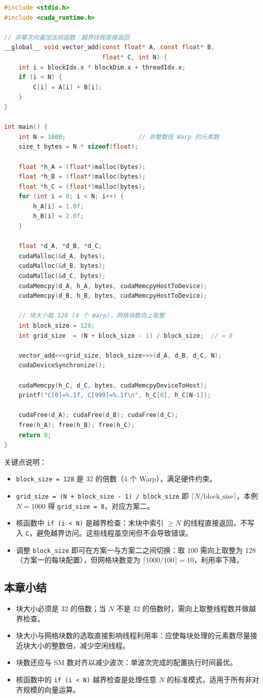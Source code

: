 \begin{lstlisting}[language=C]
#include <stdio.h>
#include <cuda_runtime.h>

// 非幂次向量加法核函数：越界线程直接返回
__global__ void vector_add(const float* A, const float* B,
                           float* C, int N) {
    int i = blockIdx.x * blockDim.x + threadIdx.x;
    if (i < N) {
        C[i] = A[i] + B[i];
    }
}

int main() {
    int N = 1000;                    // 非整数倍 Warp 的元素数
    size_t bytes = N * sizeof(float);

    float *h_A = (float*)malloc(bytes);
    float *h_B = (float*)malloc(bytes);
    float *h_C = (float*)malloc(bytes);
    for (int i = 0; i < N; i++) {
        h_A[i] = 1.0f;
        h_B[i] = 2.0f;
    }

    float *d_A, *d_B, *d_C;
    cudaMalloc(&d_A, bytes);
    cudaMalloc(&d_B, bytes);
    cudaMalloc(&d_C, bytes);
    cudaMemcpy(d_A, h_A, bytes, cudaMemcpyHostToDevice);
    cudaMemcpy(d_B, h_B, bytes, cudaMemcpyHostToDevice);

    // 块大小取 128 (4 个 Warp)，网格块数向上取整
    int block_size = 128;
    int grid_size  = (N + block_size - 1) / block_size;  // = 8

    vector_add<<<grid_size, block_size>>>(d_A, d_B, d_C, N);
    cudaDeviceSynchronize();

    cudaMemcpy(h_C, d_C, bytes, cudaMemcpyDeviceToHost);
    printf("C[0]=%.1f, C[999]=%.1f\n", h_C[0], h_C[N-1]);

    cudaFree(d_A); cudaFree(d_B); cudaFree(d_C);
    free(h_A); free(h_B); free(h_C);
    return 0;
}
\end{lstlisting}

关键点说明：

\begin{itemize}
    \item \texttt{block\_size = 128} 是 32 的倍数（4 个 Warp），满足硬件约束。
    \item \texttt{grid\_size = (N + block\_size - 1) / block\_size} 即 $\lceil N / \text{block\_size} \rceil$，本例 $N = 1000$ 得 \texttt{grid\_size = 8}，对应方案二。
    \item 核函数中 \texttt{if (i < N)} 是越界检查：末块中索引 $\geq N$ 的线程直接返回，不写入 \texttt{C}，避免越界访问。这些线程虽空闲但不会导致错误。
    \item 调整 \texttt{block\_size} 即可在方案一与方案二之间切换：取 100 需向上取整为 128（方案一的每块配置），但网格块数变为 $\lceil 1000/100\rceil = 10$，利用率下降。
\end{itemize}

\subsection{本章小结}

\begin{itemize}
    \item 块大小必须是 32 的倍数；当 $N$ 不是 32 的倍数时，需向上取整线程数并做越界检查。
    \item 块大小与网格块数的选取直接影响线程利用率：应使每块处理的元素数尽量接近块大小的整数倍，减少空闲线程。
    \item 块数还应与 SM 数对齐以减少波次：单波次完成的配置执行时间最优。
    \item 核函数中的 \texttt{if (i < N)} 越界检查是处理任意 $N$ 的标准模式，适用于所有非对齐规模的向量运算。
\end{itemize}
